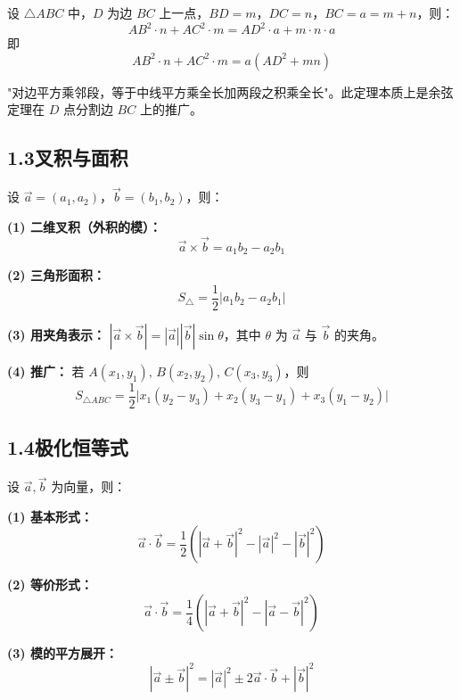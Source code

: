 \documentclass[12pt, a4paper]{ctexart}
\begin{document}
\begin{knowledgebox}[斯图尔特定理]
设 $\triangle ABC$ 中，$D$ 为边 $BC$ 上一点，$BD = m$，$DC = n$，$BC = a = m + n$，则：
\[
AB^2 \cdot n + AC^2 \cdot m = AD^2 \cdot a + m \cdot n \cdot a
\]
即
\[
AB^2 \cdot n + AC^2 \cdot m = a(AD^2 + mn)
\]
\end{knowledgebox}

\begin{tipbox}[记忆口诀]
"对边平方乘邻段，等于中线平方乘全长加两段之积乘全长"。此定理本质上是余弦定理在 $D$ 点分割边 $BC$ 上的推广。
\end{tipbox}

\subsection*{1.3\quad 叉积与面积}

\begin{knowledgebox}[二维叉积与面积公式]
设 $\vec{a} = (a_1, a_2)$，$\vec{b} = (b_1, b_2)$，则：

\textbf{(1) 二维叉积（外积的模）：}
\[
\vec{a} \times \vec{b} = a_1 b_2 - a_2 b_1
\]

\textbf{(2) 三角形面积：}
\[
S_{\triangle} = \frac{1}{2} |a_1 b_2 - a_2 b_1|
\]

\textbf{(3) 用夹角表示：} $|\vec{a} \times \vec{b}| = |\vec{a}||\vec{b}|\sin\theta$，其中 $\theta$ 为 $\vec{a}$ 与 $\vec{b}$ 的夹角。

\textbf{(4) 推广：} 若 $A(x_1,y_1),\, B(x_2,y_2),\, C(x_3,y_3)$，则
\[
S_{\triangle ABC} = \frac{1}{2}\bigl|x_1(y_2-y_3) + x_2(y_3-y_1) + x_3(y_1-y_2)\bigr|
\]
\end{knowledgebox}

\subsection*{1.4\quad 极化恒等式}

\begin{knowledgebox}[极化恒等式]
设 $\vec{a}, \vec{b}$ 为向量，则：

\textbf{(1) 基本形式：}
\[
\vec{a} \cdot \vec{b} = \frac{1}{2}\left(|\vec{a}+\vec{b}|^2 - |\vec{a}|^2 - |\vec{b}|^2\right)
\]

\textbf{(2) 等价形式：}
\[
\vec{a} \cdot \vec{b} = \frac{1}{4}\left(|\vec{a}+\vec{b}|^2 - |\vec{a}-\vec{b}|^2\right)
\]

\textbf{(3) 模的平方展开：}
\[
|\vec{a} \pm \vec{b}|^2 = |\vec{a}|^2 \pm 2\vec{a}\cdot\vec{b} + |\vec{b}|^2
\]
\end{knowledgebox}
\end{document}
